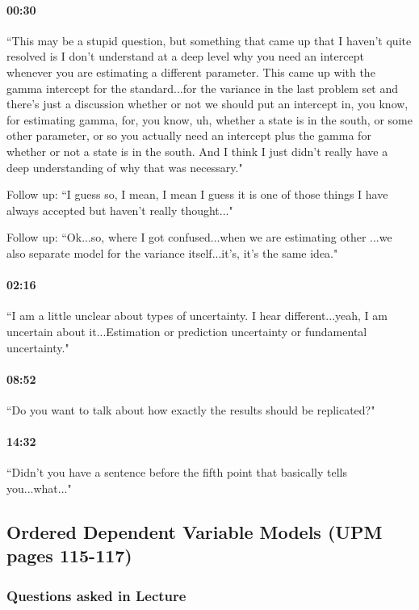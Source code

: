 \documentclass[11pt]{article}
\begin{document}
\paragraph{00:30} ``This may be a stupid question, but something that came up that I haven't quite resolved is I don't understand at a deep level why you need an intercept whenever you are estimating a different parameter. This came up with the gamma intercept for the standard...for the variance in the last problem set and there's just a discussion whether or not we should put an intercept in, you know, for estimating gamma, for, you know, uh, whether a state is in the south, or some other parameter, or so you actually need an intercept plus the gamma for whether or not a state is in the south. And I think I just didn't really have a deep understanding of why that was necessary."

Follow up: ``I guess so, I mean, I mean I guess it is one of those things I have always accepted but haven't really thought..."

Follow up: ``Ok...so, where I got confused...when we are estimating other ...we also separate model for the variance itself...it's, it's the same idea."

\paragraph{02:16} ``I am a little unclear about types of uncertainty. I hear different...yeah, I am uncertain about it...Estimation or prediction uncertainty or fundamental uncertainty."

\paragraph{08:52} ``Do you want to talk about how exactly the results should be replicated?"

\paragraph{14:32} ``Didn't you have a sentence before the fifth point that basically tells you...what..."

\subsection{Ordered Dependent Variable Models (UPM pages 115-117)}

\subsubsection{Questions asked in Lecture}
\end{document}
